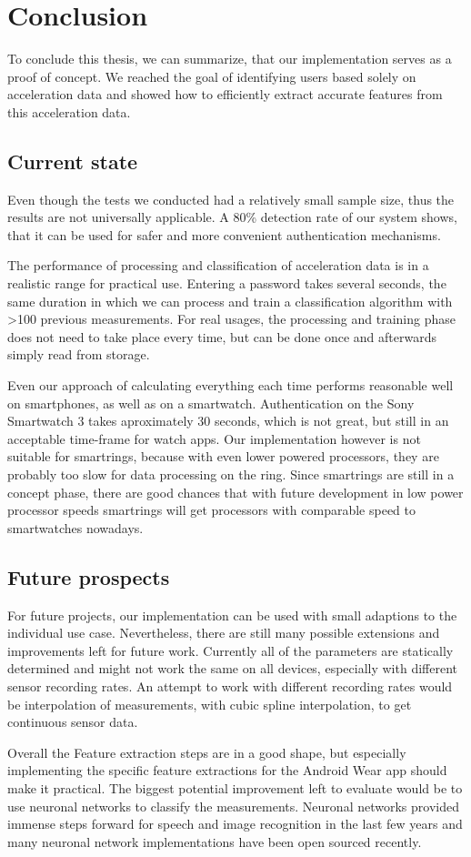\chapter{Conclusion}\label{chapter:conclusion}
To conclude this thesis, we can summarize, that our implementation serves as a proof of concept. We reached the goal of identifying users based solely on acceleration data and showed how to efficiently extract accurate features from this acceleration data.

\section{Current state}
Even though the tests we conducted had a relatively small sample size, thus the results are not universally applicable. A 80\% detection rate of our system shows, that it can be used for safer and more convenient authentication mechanisms.

The performance of processing and classification of acceleration data is in a realistic range for practical use. Entering a password takes several seconds, \ie the same duration in which we can process and train a classification algorithm with >100 previous measurements. For real usages, the processing and training phase does not need to take place every time, but can be done once and afterwards simply read from storage.

Even our approach of calculating everything each time performs reasonable well on smartphones, as well as on a smartwatch. Authentication on the Sony Smartwatch 3 takes aproximately 30 seconds, which is not great, but still in an acceptable time-frame for watch \glspl{app}. Our implementation however is not suitable for smartrings, because with even lower powered processors, they are probably too slow for data processing on the ring. Since smartrings are still in a concept phase, there are good chances that with future development in low power processor speeds smartrings will get processors with comparable speed to smartwatches nowadays.

\section{Future prospects}
For future projects, our implementation can be used with small adaptions to the individual use case. Nevertheless, there are still many possible extensions and improvements left for future work. Currently all of the parameters are statically determined and might not work the same on all devices, especially with different sensor recording rates. An attempt to work with different recording rates would be interpolation of measurements, \eg with cubic spline interpolation, to get continuous sensor data.

Overall the Feature extraction steps are in a good shape, but especially implementing the specific feature extractions for the Android Wear \gls{app} should make it practical. The biggest potential improvement left to evaluate would be to use neuronal networks to classify the measurements. Neuronal networks provided immense steps forward for speech and image recognition in the last few years and many neuronal network implementations have been open sourced recently.
